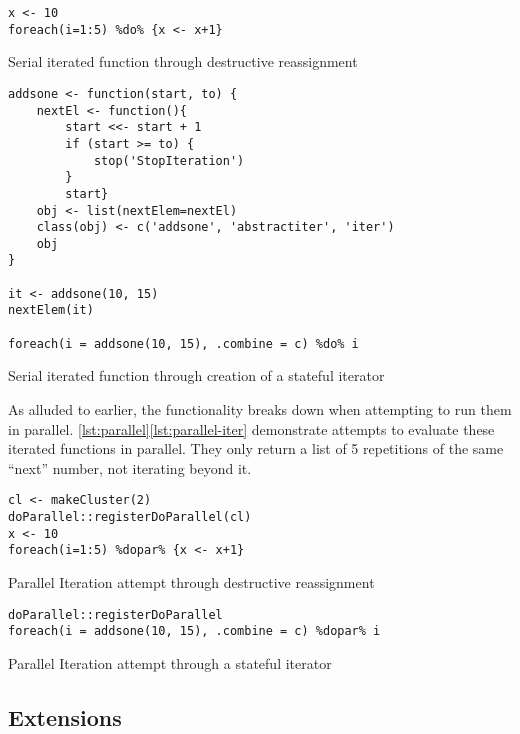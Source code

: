 \begin{listing}
	\begin{verbatim}
x <- 10
foreach(i=1:5) %do% {x <- x+1}
\end{verbatim}
	\caption{Serial iterated function through destructive reassignment}
	\label{lst:serial}
\end{listing}

\begin{listing}
	\begin{verbatim}
addsone <- function(start, to) {
	nextEl <- function(){
		start <<- start + 1
		if (start >= to) {
			stop('StopIteration')
		}
		start}
	obj <- list(nextElem=nextEl)
	class(obj) <- c('addsone', 'abstractiter', 'iter')
	obj
}

it <- addsone(10, 15)
nextElem(it)

foreach(i = addsone(10, 15), .combine = c) %do% i
\end{verbatim}
	\caption{Serial iterated function through creation of a stateful iterator}
	\label{lst:serial-iter}
\end{listing}

As alluded to earlier, the functionality breaks down when attempting to
run them in parallel. \cref{lst:parallel}\cref{lst:parallel-iter}
demonstrate attempts to evaluate these iterated functions in parallel.
They only return a list of 5 repetitions of the same ``next'' number,
not iterating beyond it.

\begin{listing}
	\begin{verbatim}
cl <- makeCluster(2)
doParallel::registerDoParallel(cl)
x <- 10
foreach(i=1:5) %dopar% {x <- x+1}
\end{verbatim}
	\caption{Parallel Iteration attempt through destructive reassignment}
	\label{lst:parallel}
\end{listing}

\begin{listing}
	\begin{verbatim}
doParallel::registerDoParallel
foreach(i = addsone(10, 15), .combine = c) %dopar% i
\end{verbatim}
	\caption{Parallel Iteration attempt through a stateful iterator}
	\label{lst:parallel-iter}
\end{listing}

\subsection*{Extensions}

